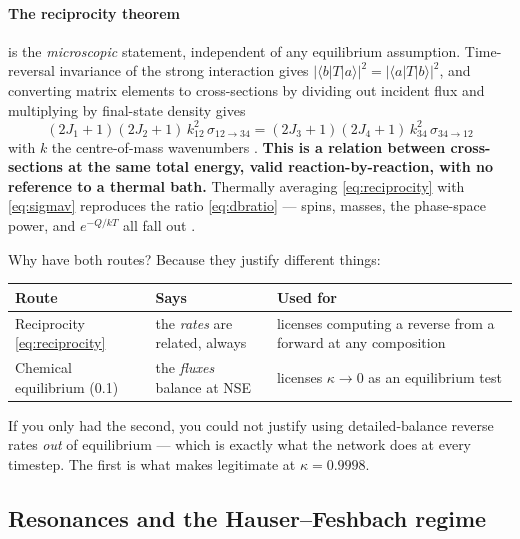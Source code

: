 \paragraph{The reciprocity theorem} is the \emph{microscopic} statement,
independent of any equilibrium assumption. Time-reversal invariance of the
strong interaction gives $|\langle b|T|a\rangle|^2 = |\langle a|T|b\rangle|^2$,
and converting matrix elements to cross-sections by dividing out incident flux
and multiplying by final-state density gives
%
\begin{equation}
\boxed{\;
(2J_1+1)(2J_2+1)\,k_{12}^2\,\sigma_{12\to34}
= (2J_3+1)(2J_4+1)\,k_{34}^2\,\sigma_{34\to12}
\;}
\label{eq:reciprocity}
\end{equation}
%
with $k$ the centre-of-mass wavenumbers \citep[cf.][p.~30]{blatt1952,cyburt2010}.
\textbf{This is a relation between cross-sections at the same total energy,
valid reaction-by-reaction, with no reference to a thermal bath.} Thermally
averaging \eqref{eq:reciprocity} with \eqref{eq:sigmav} reproduces the ratio
\eqref{eq:dbratio} --- spins, masses, the phase-space power, and $e^{-Q/kT}$ all
fall out \citep{rauscher2000}.

Why have both routes? Because they justify different things:

\begin{center}
\begin{tabularx}{\textwidth}{@{}L{4.6cm} L{4.4cm} Y@{}}
\toprule
\textbf{Route} & \textbf{Says} & \textbf{Used for} \\
\midrule
Reciprocity \eqref{eq:reciprocity} & the \emph{rates} are related, always &
  licenses computing a reverse from a forward at any composition \\
Chemical equilibrium (0.1) & the \emph{fluxes} balance at NSE &
  licenses $\kappa \to 0$ as an equilibrium test \\
\bottomrule
\end{tabularx}
\end{center}

If you only had the second, you could not justify using detailed-balance
reverse rates \emph{out} of equilibrium --- which is exactly what the network
does at every timestep. The first is what makes  legitimate at
$\kappa = 0.9998$.

\subsection{Resonances and the Hauser--Feshbach regime}
\label{sec:hf}

